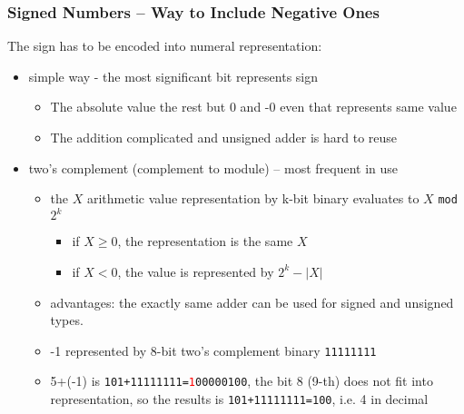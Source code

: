 \documentclass{beamer}
\begin{document}
\begin{frame}
\frametitle{Signed Numbers -- Way to Include Negative Ones}

The sign has to be encoded into numeral representation:
\begin{itemize}
\item simple way - the most significant bit represents sign
\begin{itemize}
\item The absolute value the rest but 0 and -0 even that represents same value
\item The addition complicated and unsigned adder is hard to reuse
\end{itemize}
\item two's complement (complement to module) -- most frequent in use
\begin{itemize}
\item the $X$ arithmetic value representation by k-bit binary evaluates to $X$ \texttt{mod} $2^k$
\begin{itemize}
\item if $X\ge0$, the representation is the same $X$
\item if $X<0$, the value is represented by $2^k-|X|$
\end{itemize}
\item advantages: the exactly same adder can be used for signed and unsigned types.
\end{itemize}
\begin{itemize}
\item -1 represented by 8-bit two's complement binary \texttt{11111111}
\item 5+(-1) is \texttt{101+11111111=\textcolor{red}{1}00000100}, the bit 8 (9-th) does not fit into representation, so the results is \texttt{101+11111111=100}, i.e. 4 in decimal
\end{itemize}
\end{itemize}


\end{frame}
\end{document}
